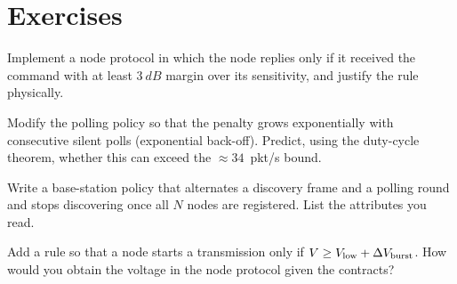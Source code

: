 \section*{Exercises}
\begin{exercise}
Implement a node protocol in which the node replies only if it received the command with at least $\SI{3}{dB}$ margin over its sensitivity, and justify the rule physically.
\end{exercise}
\begin{exercise}
Modify the polling policy so that the penalty grows exponentially with consecutive silent polls (exponential back-off). Predict, using the duty-cycle theorem, whether this can exceed the $\approx34$~pkt/s bound.
\end{exercise}
\begin{exercise}
Write a base-station policy that alternates a discovery frame and a polling round and stops discovering once all $N$ nodes are registered. List the  attributes you read.
\end{exercise}
\begin{exercise}
Add a rule so that a node starts a transmission only if $V\ge V_{\mathrm{low}}+\Delta V_{\mathrm{burst}}$. How would you obtain the voltage in the node protocol given the contracts?
\end{exercise}
